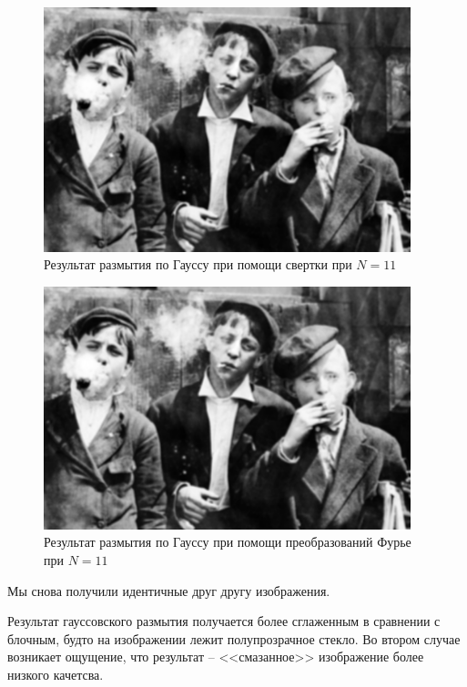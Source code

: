 \begin{figure}[ht!]
    \centering
    \includegraphics[width=0.95\textwidth]{images/result/task_2/Gaussian_11.png}
    \caption{Результат размытия по Гауссу при помощи свертки при $N=11$}
    \label{fig:ga_c_11}
\end{figure}

\begin{figure}[ht!]
    \centering
    \includegraphics[width=0.95\textwidth]{images/result/task_2/Gaussian_fourier_11.png}
    \caption{Результат размытия по Гауссу при помощи преобразований Фурье при $N=11$}
    \label{fig:ga_f_11}
\end{figure}

Мы снова получили идентичные друг другу изображения. 

Результат гауссовского размытия получается более сглаженным в сравнении с блочным, будто на изображении лежит полупрозрачное стекло. Во втором случае возникает ощущение, что результат -- <<смазанное>> изображение более низкого качетсва.

